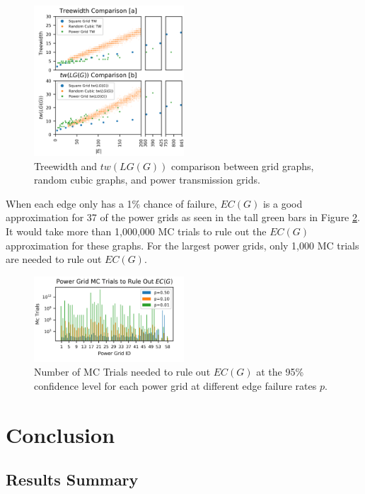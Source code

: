 \documentclass[12pt,twocolumn]{article}
\begin{document}
\begin{figure}[t]
\caption{Treewidth and $tw(LG(G))$ comparison between grid graphs, random cubic graphs, and power transmission grids.}
\label{fig:Width Comparison}
\includegraphics[width=0.5\textwidth]{../figures/WidthCompare.png}
\end{figure}

When each edge only has a 1\% chance of failure, \(EC(G)\) is a good approximation for 37 of the power grids as seen in the tall green bars in Figure \ref{fig:Power Grid MC}. It would take more than 1,000,000 MC trials to rule out the \(EC(G)\) approximation for these graphs. For the largest power grids, only 1,000 MC trials are needed to rule out \(EC(G)\).

\begin{figure}[t]
\caption{Number of MC Trials needed to rule out $EC(G)$ at the 95\% confidence level for each power grid at different edge failure rates $p$.}
\label{fig:Power Grid MC}
\includegraphics[width=0.5\textwidth]{../figures/PowerGridMC.png}
\end{figure}

\hypertarget{conclusion}{%
\section{Conclusion}\label{conclusion}}

\hypertarget{results-summary}{%
\subsection{Results Summary}\label{results-summary}}
\end{document}
